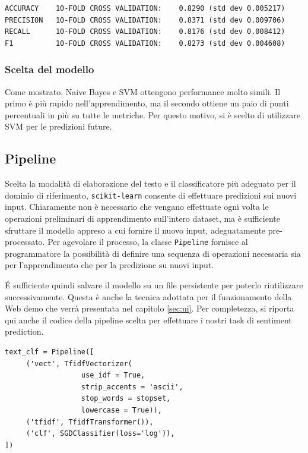 \documentclass[hidelinks, 12pt]{article}
\begin{document}
\begin{verbatim}
ACCURACY    10-FOLD CROSS VALIDATION:    0.8290 (std dev 0.005217)
PRECISION   10-FOLD CROSS VALIDATION:    0.8371 (std dev 0.009706)
RECALL      10-FOLD CROSS VALIDATION:    0.8176 (std dev 0.008412)
F1          10-FOLD CROSS VALIDATION:    0.8273 (std dev 0.004608)
\end{verbatim}


\subsubsection{Scelta del modello}

Come mostrato, Naive Bayes e SVM ottengono performance molto simili. Il primo è più rapido nell'apprendimento, ma il secondo ottiene un paio di punti percentuali in più su tutte le metriche. Per questo motivo, si è scelto di utilizzare SVM per le predizioni future.



\subsection{Pipeline}
\label{sec:pipeline}

Scelta la modalità di elaborazione del testo e il classificatore più adeguato per il dominio di riferimento, \texttt{scikit-learn} consente di effettuare predizioni sui nuovi input. Chiaramente non è necessario che vengano effettuate ogni volta le operazioni preliminari di apprendimento sull'intero dataset, ma è sufficiente sfruttare il modello appreso a cui fornire il nuovo input, adeguatamente pre-processato. Per agevolare il processo, la classe \texttt{Pipeline} fornisce al programmatore la possibilità di definire una sequenza di operazioni necessaria sia per l'apprendimento che per la predizione su nuovi input.

É sufficiente quindi salvare il modello su un file persistente per poterlo riutilizzare successivamente. Questa è anche la tecnica adottata per il funzionamento della Web demo che verrà presentata nel capitolo \ref{sec:ui}. Per completezza, si riporta qui anche il codice della pipeline scelta per effettuare i nostri task di sentiment prediction.

\begin{verbatim}
text_clf = Pipeline([
     ('vect', TfidfVectorizer(
                  use_idf = True,
                  strip_accents = 'ascii',
                  stop_words = stopset,
                  lowercase = True)),
     ('tfidf', TfidfTransformer()),
     ('clf', SGDClassifier(loss='log')),
])
\end{verbatim}
\end{document}
